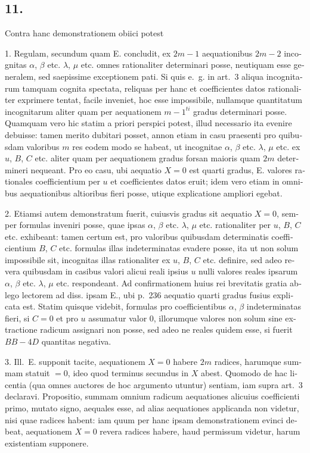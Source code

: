 \documentclass[12pt,a4paper]{article}
\begin{document}
\begin{otherlanguage}{latin}
\subsection*{11.}
Contra hanc demonstrationem obiici potest

1. Regulam, secundum quam E. concludit, ex $2m-1$ aequationibus $2m-2$ incognitas $\alpha$, $\beta$ etc. $\lambda$, $\mu$ etc. omnes rationaliter determinari posse, neutiquam esse generalem, sed saepissime exceptionem pati. Si quis e.~g. in art.~3 aliqua incognitarum tamquam cognita spectata, reliquas per hanc et coefficientes datos rationaliter exprimere tentat, facile inveniet, hoc esse impossibile, nullamque quantitatum incognitarum aliter quam per aequationem $m-1^{ti}$ gradus determinari posse. Quamquam vero hic statim a priori perspici potest, illud necessario ita evenire debuisse: tamen merito dubitari posset, annon etiam in casu praesenti pro quibusdam valoribus $m$ res eodem modo se habeat, ut incognitae $\alpha$, $\beta$ etc. $\lambda$, $\mu$ etc. ex $u$, $B$, $C$ etc. aliter quam per aequationem gradus forsan maioris quam $2m$ determineri nequeant. Pro eo casu, ubi aequatio $X=0$ est quarti gradus, E. valores rationales coefficientium per $u$ et coefficientes datos eruit; idem vero etiam in omnibus aequationibus altioribus fieri posse, utique explicatione ampliori egebat.

2. Etiamsi autem demonstratum fuerit, cuiusvis gradus sit aequatio $X=0$, semper formulas inveniri posse, quae ipsas $\alpha$, $\beta$ etc. $\lambda$, $\mu$ etc. rationaliter per $u$, $B$, $C$ etc. exhibeant: tamen certum est, pro valoribus quibusdam determinatis coefficientium $B$, $C$ etc. formulas illas indeterminatas evadere posse, ita ut non solum impossibile sit, incognitas illas rationaliter ex $u$, $B$, $C$ etc. definire, sed adeo revera quibusdam in casibus valori alicui reali ipsius $u$ nulli valores reales ipsarum $\alpha$, $\beta$ etc. $\lambda$, $\mu$ etc. respondeant. Ad confirmationem huius rei brevitatis gratia ablego lectorem ad diss. ipsam E., ubi p.~236 aequatio quarti gradus fusius explicata est. Statim quisque videbit, formulas pro coefficientibus $\alpha$, $\beta$ indeterminatas fieri, si $C=0$ et pro $u$ assumatur valor $0$, illorumque valores non solum sine extractione radicum assignari non posse, sed adeo ne reales quidem esse, si fuerit $BB-4D$ quantitas negativa.

3. Ill.~E. supponit tacite, aequationem $X=0$ habere $2m$ radices, harumque summam statuit $=0$, ideo quod terminus secundus in $X$ abest. Quomodo de hac licentia (qua omnes auctores de hoc argumento utuntur) sentiam, iam supra art.~3 declaravi. Propositio, summam omnium radicum aequationes alicuius coefficienti primo, mutato signo, aequales esse, ad alias aequationes applicanda non videtur, nisi quae radices habent: iam quum per hanc ipsam demonstrationem evinci debeat, aequationem $X=0$ revera radices habere, haud permissum videtur, harum existentiam supponere.


\end{otherlanguage}
\end{document}
